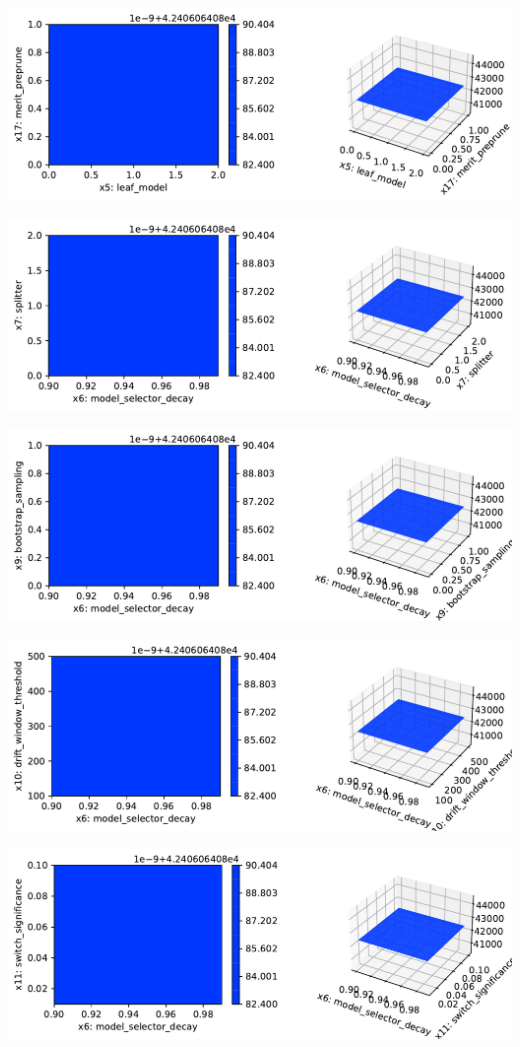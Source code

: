 \documentclass[
  letterpaper,
  DIV=11,
  numbers=noendperiod]{scrreprt}
\begin{document}
\includegraphics{024_spot_hpt_river_friedman_hatr_files/figure-pdf/cell-42-output-70.pdf}

\includegraphics{024_spot_hpt_river_friedman_hatr_files/figure-pdf/cell-42-output-71.pdf}

\includegraphics{024_spot_hpt_river_friedman_hatr_files/figure-pdf/cell-42-output-72.pdf}

\includegraphics{024_spot_hpt_river_friedman_hatr_files/figure-pdf/cell-42-output-73.pdf}

\includegraphics{024_spot_hpt_river_friedman_hatr_files/figure-pdf/cell-42-output-74.pdf}
\end{document}

